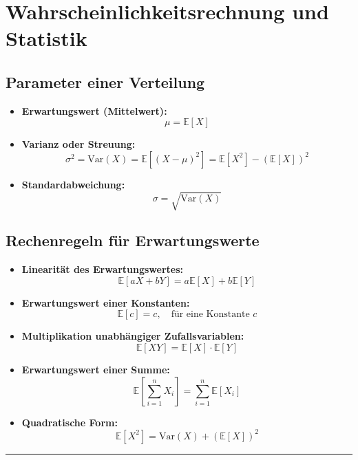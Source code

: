 \documentclass[12pt]{article}
\begin{document}
      \section*{Wahrscheinlichkeitsrechnung und Statistik}
         \noindent
         \begin{minipage}[t]{0.45\textwidth}
            \subsection*{Parameter einer Verteilung}
            \begin{itemize}
               \item \textbf{Erwartungswert (Mittelwert):} 
               \[
                  \mu = \mathbb{E}[X]
               \]
               \item \textbf{Varianz oder Streuung:} 
               \[
                  \sigma^2 = \text{Var}(X) = \mathbb{E}[(X - \mu)^2] = \mathbb{E}[X^2] - (\mathbb{E}[X])^2  %
               \]
               \item \textbf{Standardabweichung:}
               \[
                  \sigma = \sqrt{\text{Var}(X)}
               \]
            \end{itemize}
         \end{minipage}
         \hfill
         \begin{minipage}[t]{0.45\textwidth}
            \subsection*{Rechenregeln für Erwartungswerte}
               \begin{itemize}

                  \item \textbf{Linearität des Erwartungswertes:}
                  \[
                  \mathbb{E}[aX + bY] = a \mathbb{E}[X] + b \mathbb{E}[Y]
                  \]

                  \item \textbf{Erwartungswert einer Konstanten:}
                  \[
                  \mathbb{E}[c] = c, \quad \text{für eine Konstante } c
                  \]



                  \item \textbf{Multiplikation unabhängiger Zufallsvariablen:}
                  \[
                  \mathbb{E}[XY] = \mathbb{E}[X] \cdot \mathbb{E}[Y]
                  \]


                  \item \textbf{Erwartungswert einer Summe:}
                  \[
                  \mathbb{E}\left[\sum_{i=1}^n X_i\right] = \sum_{i=1}^n \mathbb{E}[X_i]
                  \]


                  \item \textbf{Quadratische Form:}
                  \[
                  \mathbb{E}[X^2] = \text{Var}(X) + (\mathbb{E}[X])^2   %
                  \]


               \end{itemize}
         \end{minipage}
         \medskip
         \hrule
\end{document}
